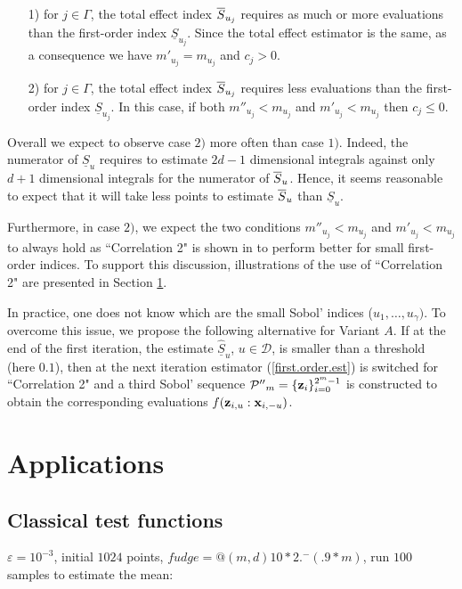 \begin{itemize}
\item[1)] for $j \in \Gamma$, the total effect index $\ov{$S$}_{u_j}$ requires as much or more evaluations than the first-order index $\underline{S}_{u_j}$. Since the total effect estimator is the same, as a consequence we have $m'_{u_j}=m_{u_j}$ and $c_j >0$.
\item[2)] for $j \in \Gamma$, the total effect index $\ov{$S$}_{u_j}$ requires less evaluations than the first-order index $\underline{S}_{u_j}$. In this case, if both $m''_{u_j} < m_{u_j}$ and $m'_{u_j} < m_{u_j}$ then $c_j \leq 0$.  
\end{itemize}
Overall we expect to observe case $2)$ more often than case $1)$. Indeed, the numerator of $\underline{S}_u$ requires to estimate $2d-1$ dimensional integrals against only $d+1$ dimensional integrals for the numerator of $\ov{$S$}_u$. Hence, it seems reasonable to expect that it will take less points to estimate $\ov{$S$}_u$ than $\underline{S}_u$. 

Furthermore, in case $2)$, we expect the two conditions $m''_{u_j} < m_{u_j}$ and $m'_{u_j} < m_{u_j}$ to always hold as ``Correlation 2" is shown in \cite{Owen} to perform better for small first-order indices. To support this discussion, illustrations of the use of ``Correlation 2" are presented in Section \ref{sec:5}. 

In practice, one does not know which are the small Sobol' indices ($u_1,\dots,u_\gamma)$. To overcome this issue, we propose the following alternative for Variant $A$. If at the end of the first iteration, the estimate $\widehat{\underline{S}}_u$, $u \in \mathcal{D}$, is smaller than a threshold (here $0.1$), then at the next iteration estimator (\ref{first.order.est}) is switched for ``Correlation 2" and a third Sobol' sequence $\mathcal{P''}_{m}=\{\boldsymbol{\mathbf{z}}_i\}_{i=0}^{2^m-1}$ is constructed to obtain the corresponding evaluations $f({\boldsymbol{\mathbf{z}}}_{i,u}:{\boldsymbol{\mathbf{x}}}_{i,-u})$.

\section{Applications}
\label{sec:5}

\subsection{Classical test functions}
\label{sec:5.1}

$\varepsilon=10^{-3}$, initial $1024$ points, $fudge = @(m,d) 10*2.^-(.9*m)$, run $100$ samples to estimate the mean:


